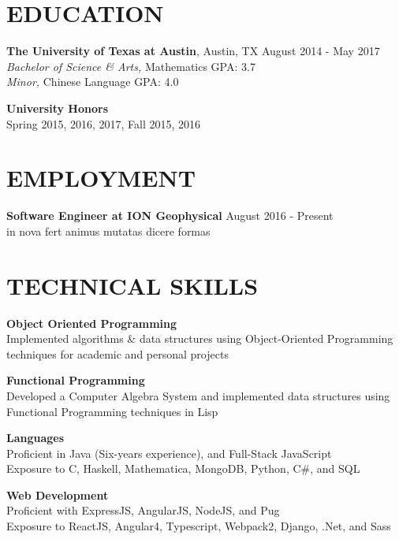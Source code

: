 \documentclass[line,margin]{res}
\begin{document}
\address{(832) 392-4834 --- robert.mitchell36@gmail.com --- www.github.com/Ahlkanvorez --- Houston, TX}

\begin{resume}

\section{EDUCATION}
	\textbf{The University of Texas at Austin}, Austin, TX 	\hfill August 2014 - May 2017 \\
	\textit{Bachelor of Science \& Arts,} Mathematics \hfill GPA: 3.7 \\
	\textit{Minor,} Chinese Language \hfill GPA:    4.0
    \begin{description}
        \item \textbf{University Honors} \hfill \\
            Spring 2015, 2016, 2017, Fall 2015, 2016 \\
    \end{description}

\section{EMPLOYMENT}
    \textbf{Software Engineer at ION Geophysical}
        \hfill August 2016 - Present \\
    in nova fert animus mutatas dicere formas

\section{TECHNICAL SKILLS}
    \begin{description}
        \item \textbf{Object Oriented Programming} \hfill \\
            Implemented algorithms \& data structures using Object-Oriented Programming techniques for academic and personal projects
        \item \textbf{Functional Programming} \hfill \\
            Developed a Computer Algebra System and implemented data structures using Functional Programming techniques in Lisp
        \item \textbf{Languages} \hfill \\
            Proficient in Java (Six-years experience), and Full-Stack JavaScript \\
            Exposure to C, Haskell, Mathematica, MongoDB, Python, C\#, and SQL
        \item \textbf{Web Development} \hfill \\
            Proficient with ExpressJS, AngularJS, NodeJS, and Pug \\
            Exposure to ReactJS, Angular4, Typescript, Webpack2, Django, .Net, and Sass
    \end{description}


\end{resume}
\end{document}

